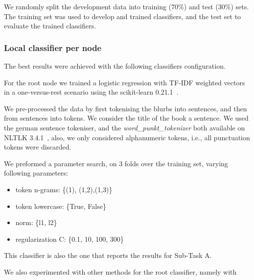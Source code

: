 \documentclass[11pt,a4paper]{article}
\begin{document}
We randomly split the development data into training (70\%) and test (30\%) sets.
The training set was used to develop and trained classifiers, and the test set
to evaluate the trained classifiers.

\subsubsection{Local classifier per node}

The best results were achieved with the following classifiers configuration.

For the root node we trained a logistic regression with TF-IDF weighted vectors
in a one-versus-rest scenario using the scikit-learn 0.21.1~\cite{Pedregosa:2011:SML:1953048.2078195}.


We pre-processed the data by first tokenising the blurbs into sentences, and then
from sentences into tokens. We consider the title of the book a sentence. We used
the german sentence tokeniser, and the \textit {word\_punkt\_tokenizer} both available
on NLTLK 3.4.1~\cite{Bird:2009:NLP:1717171}, also, we only considered alphanumeric
tokens, i.e., all punctuation tokens were discarded.


We preformed a parameter search, on 3 folds over the training set, varying following parameters:

\begin{itemize}
\item token n-grams: \{(1), (1,2),(1,3)\}
\item token lowercase: \{True, False\}
\item norm: \{l1, l2\}
\item regularization C: \{0.1, 10, 100, 300\}
\end{itemize}

This classifier is also the one that reports the results for Sub-Task A.

We also experimented with other methods for the root classifier, namely with

\end{document}
